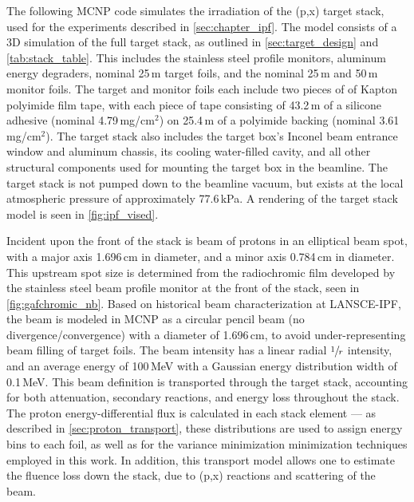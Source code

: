 The following MCNP code simulates the irradiation of the (p,x) target stack, used for the experiments described in  \autoref{sec:chapter_ipf}.
The model consists of a 3D simulation of the full target stack, as outlined in \autoref{sec:target_design} and  \autoref{tab:stack_table}.
This includes the stainless steel profile monitors, aluminum energy degraders, nominal 25\,\mmicro m  target foils, and the nominal 25\,\mmicro m   and 50\,\mmicro m  monitor foils.
The target and monitor foils each include two pieces of of Kapton polyimide film tape, with each piece of  tape consisting of 43.2\,\mmicro m of a silicone adhesive (nominal 4.79\,mg/cm$^2$) on 25.4\,\mmicro m of a polyimide backing (nominal 3.61\,mg/cm$^2$).
The target stack also includes the target box's Inconel beam entrance window and aluminum chassis, its cooling water-filled cavity, and all other structural components used for mounting the target box in the beamline.
The target stack is not pumped down to the beamline vacuum, but exists at the local atmospheric pressure of approximately 77.6\,kPa.
A rendering of the target stack model  is seen in \autoref{fig:ipf_vised}.



Incident upon the front of the stack is  beam of protons in an elliptical beam spot, with a major axis 1.696\,cm in diameter, and a minor axis 0.784\,cm in diameter.  
This upstream spot size is determined from the radiochromic film developed by the  stainless steel beam profile monitor at the front of the stack, seen in \autoref{fig:gafchromic_nb}.
Based on historical beam characterization at LANSCE-IPF, the beam is modeled in MCNP as a circular pencil beam (no divergence/convergence) with a diameter of 1.696\,cm, to avoid under-representing beam filling of target foils.
The beam intensity has a linear radial $\sfrac{1}{r}$ intensity, and an average energy of 100\,MeV  with a Gaussian energy distribution width of 0.1\,MeV.
This beam definition is transported through the target stack, accounting for both attenuation, secondary reactions, and energy loss throughout the stack.
The proton energy-differential flux is calculated in each stack element --- as described in \autoref{sec:proton_transport},  these distributions are used to assign energy bins  to each foil, as well as for the variance minimization minimization techniques employed in this work.
In addition, this transport model allows one to estimate the fluence loss down the stack, due to (p,x) reactions and scattering of the beam.











